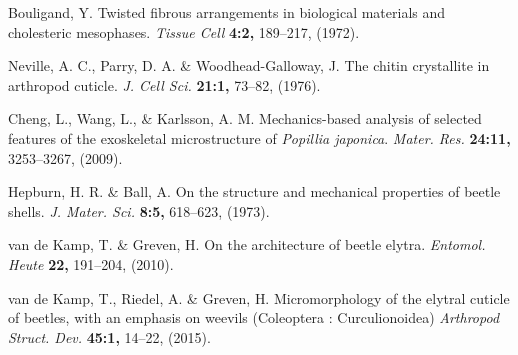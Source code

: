 \documentclass[twocolumn, linenumbers, superscriptaddress]{revtex4-1}
\begin{document}
\begin{thebibliography}{50}
				Bouligand, Y.
				Twisted fibrous arrangements in biological materials and cholesteric mesophases.
				\textit{Tissue Cell}
				\textbf{4:2,}
				189--217,
				(1972).
				
				Neville, A. C., Parry, D. A. \& Woodhead-Galloway, J.
				The chitin crystallite in arthropod cuticle.
				\textit{J. Cell Sci.}
				\textbf{21:1,}
				73--82,
				(1976).
				
				Cheng, L., Wang, L., \& Karlsson, A. M.
				Mechanics-based analysis of selected features of the exoskeletal microstructure of \textit{Popillia japonica}.
				\textit{Mater. Res.}
				\textbf{24:11,}
				3253--3267,
				(2009).
				
				Hepburn, H. R. \& Ball, A.
				On the structure and mechanical properties of beetle shells.
				\textit{J. Mater. Sci.}
				\textbf{8:5,}
				618--623,
				(1973).
				
				van de Kamp, T. \& Greven, H.
				On the architecture of beetle elytra.
				\textit{Entomol. Heute}
				\textbf{22,}
				191--204,
				(2010).
			
				van de Kamp, T., Riedel, A. \& Greven, H.
				Micromorphology of the elytral cuticle of beetles, with an emphasis on weevils (Coleoptera : Curculionoidea)
				\textit{Arthropod Struct. Dev.}
				\textbf{45:1,}
				14--22,
				(2015).
			
	\end{thebibliography}

	\begin{acknowledgements}

	\end{acknowledgements}

\end{document}
